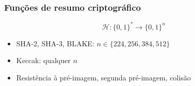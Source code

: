 \documentclass[12pt]{beamer}
\begin{document}
\begin{frame}
  \frametitle{Funções de resumo criptográfico}
  \begin{equation*}
    \mathcal{H}: \{0, 1\}^{*} \longrightarrow \{0, 1\}^{n}
  \end{equation*}

  \begin{figure}
  \end{figure}

  \begin{itemize}
    \item SHA-2, SHA-3, BLAKE: $n \in \{224, 256, 384, 512\}$
    \item Keccak: qualquer $n$
    \item Resistência à pré-imagem, segunda pré-imagem, colisão
  \end{itemize}
\end{frame}
\end{document}
